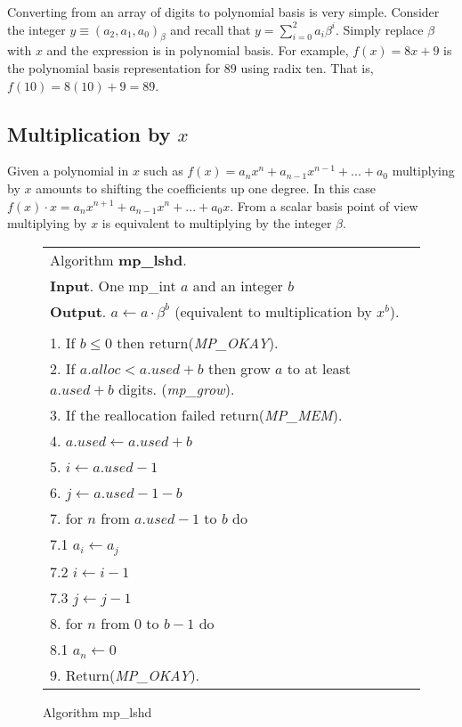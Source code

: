 \documentclass[b5paper]{book}
\begin{document}
Converting from an array of digits to polynomial basis is very simple.  Consider the integer $y \equiv (a_2, a_1, a_0)_{\beta}$ and recall that
$y = \sum_{i=0}^{2} a_i \beta^i$.  Simply replace $\beta$ with $x$ and the expression is in polynomial basis.  For example, $f(x) = 8x + 9$ is the
polynomial basis representation for $89$ using radix ten.  That is, $f(10) = 8(10) + 9 = 89$.  

\subsection{Multiplication by $x$}

Given a polynomial in $x$ such as $f(x) = a_n x^n + a_{n-1} x^{n-1} + ... + a_0$ multiplying by $x$ amounts to shifting the coefficients up one 
degree.  In this case $f(x) \cdot x = a_n x^{n+1} + a_{n-1} x^n + ... + a_0 x$.  From a scalar basis point of view multiplying by $x$ is equivalent to
multiplying by the integer $\beta$.  

\newpage\begin{figure}[!here]
\begin{small}
\begin{center}
\begin{tabular}{l}
\hline Algorithm \textbf{mp\_lshd}. \\
\textbf{Input}.   One mp\_int $a$ and an integer $b$ \\
\textbf{Output}.  $a \leftarrow a \cdot \beta^b$ (equivalent to multiplication by $x^b$). \\
\hline \\
1.  If $b \le 0$ then return(\textit{MP\_OKAY}). \\
2.  If $a.alloc < a.used + b$ then grow $a$ to at least $a.used + b$ digits.  (\textit{mp\_grow}). \\
3.  If the reallocation failed return(\textit{MP\_MEM}). \\
4.  $a.used \leftarrow a.used + b$ \\
5.  $i \leftarrow a.used - 1$ \\
6.  $j \leftarrow a.used - 1 - b$ \\
7.  for $n$ from $a.used - 1$ to $b$ do \\
\hspace{3mm}7.1  $a_{i} \leftarrow a_{j}$ \\
\hspace{3mm}7.2  $i \leftarrow i - 1$ \\
\hspace{3mm}7.3  $j \leftarrow j - 1$ \\
8.  for $n$ from 0 to $b - 1$ do \\
\hspace{3mm}8.1  $a_n \leftarrow 0$ \\
9.  Return(\textit{MP\_OKAY}). \\
\hline
\end{tabular}
\end{center}
\end{small}
\caption{Algorithm mp\_lshd}
\end{figure}
\end{document}
